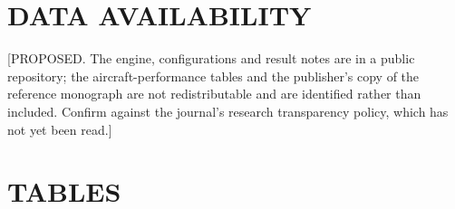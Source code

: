 \documentclass[12pt,a4paper]{article}
\begin{document}
\section*{DATA AVAILABILITY}
[PROPOSED. The engine, configurations and result notes are in a public repository; the
aircraft-performance tables and the publisher's copy of the reference monograph are not
redistributable and are identified rather than included. Confirm against the journal's research
transparency policy, which has not yet been read.]

\section*{TABLES}
\end{document}

